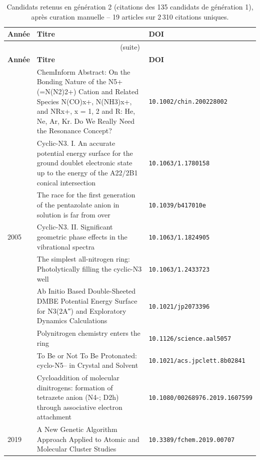 \begin{longtable}{@{}p{1.0cm}p{10.5cm}p{3.5cm}@{}}
\caption{Candidats retenus en g\'en\'eration 2 (citations des 135 candidats de g\'en\'eration 1), apr\`es curation manuelle -- 19 articles sur 2\,310 citations uniques.}
\label{tab:citation-search-gen2}\\
\toprule
\textbf{Ann\'ee} & \textbf{Titre} & \textbf{DOI} \\
\midrule
\endfirsthead
\multicolumn{3}{c}{\small (suite)}\\
\toprule
\textbf{Ann\'ee} & \textbf{Titre} & \textbf{DOI} \\
\midrule
\endhead
\bottomrule
\endfoot
\bottomrule
\endlastfoot
\addlinespace
2002 & ChemInform Abstract: On the Bonding Nature of the N5+ (=N(N2)2+) Cation and Related Species N(CO)x+, N(NH3)x+, and NRx+, x = 1, 2 and R: He, Ne, Ar, Kr. Do We Really Need the Resonance Concept? & \small\texttt{10.1002/chin.200228002} \\
\addlinespace
2004 & Cyclic-N3. I. An accurate potential energy surface for the ground doublet electronic state up to the energy of the A22/2B1 conical intersection & \small\texttt{10.1063/1.1780158} \\
\addlinespace
2005 & The race for the first generation of the pentazolate anion in solution is far from over & \small\texttt{10.1039/b417010e} \\
2005 & Cyclic-N3. II. Significant geometric phase effects in the vibrational spectra & \small\texttt{10.1063/1.1824905} \\
\addlinespace
2007 & The simplest all-nitrogen ring: Photolytically filling the cyclic-N3 well & \small\texttt{10.1063/1.2433723} \\
\addlinespace
2011 & Ab Initio Based Double-Sheeted DMBE Potential Energy Surface for N3(2A″) and Exploratory Dynamics Calculations & \small\texttt{10.1021/jp2073396} \\
\addlinespace
2017 & Polynitrogen chemistry enters the ring & \small\texttt{10.1126/science.aal5057} \\
\addlinespace
2018 & To Be or Not To Be Protonated: cyclo-N5– in Crystal and Solvent & \small\texttt{10.1021/acs.jpclett.8b02841} \\
\addlinespace
2019 & Cycloaddition of molecular dinitrogens: formation of tetrazete anion (N4-; D2h) through associative electron attachment & \small\texttt{10.1080/00268976.2019.1607599} \\
2019 & A New Genetic Algorithm Approach Applied to Atomic and Molecular Cluster Studies & \small\texttt{10.3389/fchem.2019.00707} \\

\end{longtable}
